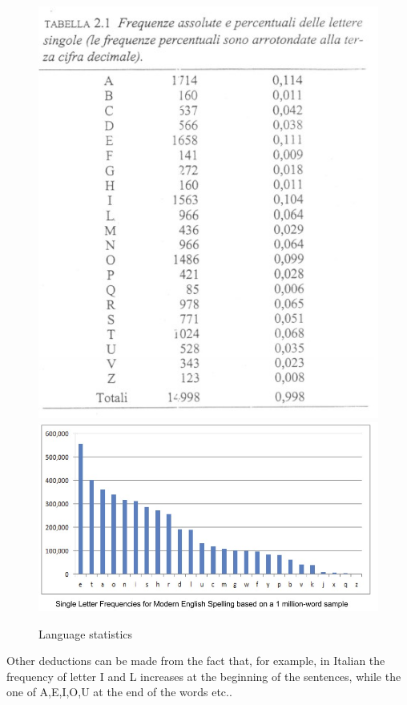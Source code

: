 \begin{figure}[h!]
        \centering
        \includegraphics[scale = 1.2]{img/cl8.jpg}
        \includegraphics[scale = 1.2]{img/cl9.jpg}
        \label{cl8_9}
        \caption{Language statistics}
\end{figure}

Other deductions can be made from the fact that, for example, in Italian the frequency of letter I and L increases at the beginning of the sentences, while the one of A,E,I,O,U at the end of the words etc.. 

